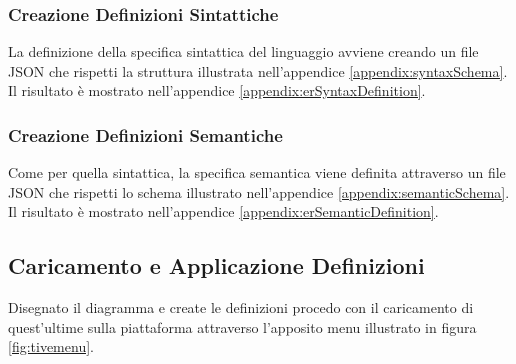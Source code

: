             \subsubsection{Creazione Definizioni Sintattiche}
                La definizione della specifica sintattica del linguaggio avviene creando un file JSON che rispetti la struttura illustrata nell'appendice \ref{appendix:syntaxSchema}. Il risultato è mostrato nell'appendice \ref{appendix:erSyntaxDefinition}.

            \subsubsection{Creazione Definizioni Semantiche}
                Come per quella sintattica, la specifica semantica viene definita attraverso un file JSON che rispetti lo schema illustrato nell'appendice \ref{appendix:semanticSchema}. Il risultato è mostrato nell'appendice \ref{appendix:erSemanticDefinition}.

        \subsection{Caricamento e Applicazione Definizioni}
            Disegnato il diagramma e create le definizioni procedo con il caricamento di quest'ultime sulla piattaforma attraverso l'apposito menu illustrato in figura \ref{fig:tivemenu}.

